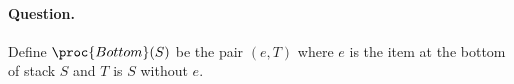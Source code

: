 \paragraph{Question.} Define \(\proc{Bottom}(S)\) be the pair \((e, T)\)
where \(e\) is the item at the bottom of stack \(S\) and \(T\) is
\(S\) without \(e\).

